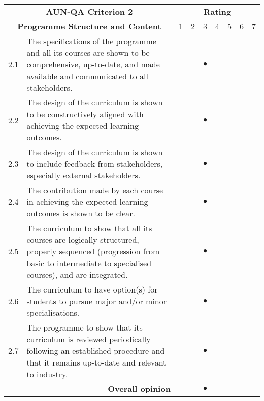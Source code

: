 \begin{longtable}{|c| p{}|p{0.3cm}|p{0.3cm}|c|p{0.3cm}|p{0.3cm}|p{0.3cm}|p{0.3cm}|}
	\hline
	\multicolumn{2}{|c|}{\bf AUN-QA Criterion 2}&\multicolumn{7}{c|}{\bf Rating}\\\cline{3-9}
	\multicolumn{2}{|c|}{\bf Programme Structure and Content}&1&2&3&4&5&6&7\\\hline
	\endhead
2.1&The specifications of the programme and all its courses are shown to be comprehensive, up-to-date, and made available and communicated to all stakeholders.&&& {\huge{$\bullet$}}&&&&\\\hline 

2.2&The design of the curriculum is shown to be constructively aligned with achieving the expected learning outcomes.&&& {\huge{$\bullet$}}&&&&\\\hline 

2.3& The design of the curriculum is shown to include feedback from stakeholders, especially external stakeholders. &&& {\huge{$\bullet$}}&&&&\\\hline

2.4& The contribution made by each course in achieving the expected learning outcomes is shown to be clear. &&& {\huge{$\bullet$}}&&&&\\\hline

2.5& The curriculum to show that all its courses are logically structured, properly sequenced (progression from basic to intermediate to specialised courses), and are integrated. &&& {\huge{$\bullet$}}&&&&\\\hline

2.6&The curriculum to have option(s) for students to pursue major and/or minor specialisations. &&& {\huge{$\bullet$}}&&&&\\\hline

2.7&The programme to show that its curriculum is reviewed periodically following an established procedure and that it remains up-to-date and relevant to industry.&&& {\huge{$\bullet$}}&&&&\\\hline 

\multicolumn{2}{|r|}{\bf Overall opinion}&&& {\huge{$\bullet$}}&&&&\\\hline

\end{longtable}




